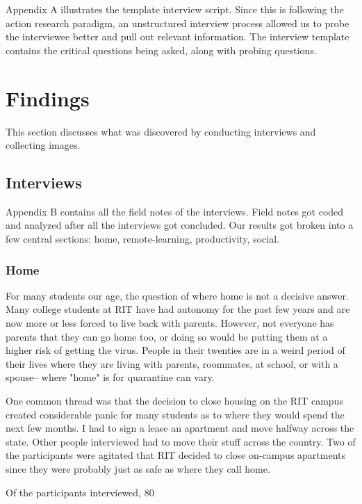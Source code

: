 \documentclass[12pt,
 reprint,
nofootinbib,
 amsmath,amssymb,
 aps,
floatfix,
]{revtex4-2}
\begin{document}
Appendix A illustrates the template interview script.
Since this is following the action research paradigm, an unstructured interview process allowed us to probe the interviewee better and pull out relevant information.
The interview template contains the critical questions being asked, along with probing questions.


\section{Findings}

This section discusses what was discovered by conducting interviews and collecting images.

\subsection{Interviews}

Appendix B contains all the field notes of the interviews. Field notes got coded and analyzed after all the interviews got concluded. Our results got broken into a few central sections: home, remote-learning, productivity, social.


\subsubsection{Home}

For many students our age, the question of where home is not a decisive answer.
Many college students at RIT have had autonomy for the past few years and are now more or less forced to live back with parents. However, not everyone has parents that they can go home too, or doing so would be putting them at a higher risk of getting the virus. People in their twenties are in a weird period of their lives where they are living with parents, roommates, at school, or with a spouse-- where "home" is for quarantine can vary.

One common thread was that the decision to close housing on the RIT campus created considerable panic for many students as to where they would spend the next few months. I had to sign a lease an apartment and move halfway across the state. Other people interviewed had to move their stuff across the country.
Two of the participants were agitated that RIT decided to close on-campus apartments since they were probably just as safe as where they call home. 

Of the participants interviewed, 80%
\end{document}
